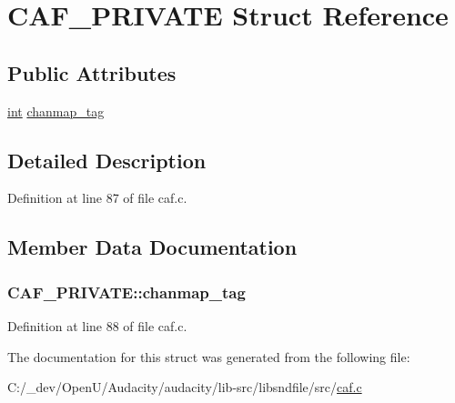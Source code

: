 \hypertarget{struct_c_a_f___p_r_i_v_a_t_e}{}\section{C\+A\+F\+\_\+\+P\+R\+I\+V\+A\+TE Struct Reference}
\label{struct_c_a_f___p_r_i_v_a_t_e}
\subsection*{Public Attributes}
\begin{DoxyCompactItemize}
\item 
\hyperlink{xmltok_8h_a5a0d4a5641ce434f1d23533f2b2e6653}{int} \hyperlink{struct_c_a_f___p_r_i_v_a_t_e_a1e8e64f7f3603d2cb031922cbaef86c7}{chanmap\+\_\+tag}
\end{DoxyCompactItemize}


\subsection{Detailed Description}


Definition at line 87 of file caf.\+c.



\subsection{Member Data Documentation}
\subsubsection[{\texorpdfstring{chanmap\+\_\+tag}{chanmap_tag}}]{ C\+A\+F\+\_\+\+P\+R\+I\+V\+A\+T\+E\+::chanmap\+\_\+tag}\hypertarget{struct_c_a_f___p_r_i_v_a_t_e_a1e8e64f7f3603d2cb031922cbaef86c7}{}\label{struct_c_a_f___p_r_i_v_a_t_e_a1e8e64f7f3603d2cb031922cbaef86c7}


Definition at line 88 of file caf.\+c.



The documentation for this struct was generated from the following file\+:\begin{DoxyCompactItemize}
\item 
C\+:/\+\_\+dev/\+Open\+U/\+Audacity/audacity/lib-\/src/libsndfile/src/\hyperlink{caf_8c}{caf.\+c}\end{DoxyCompactItemize}

